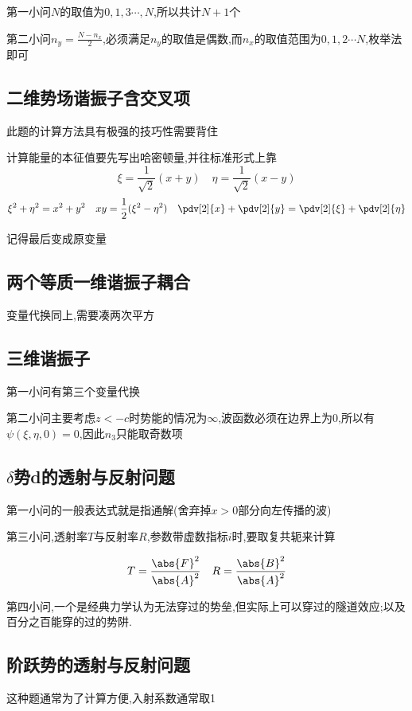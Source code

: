             第一小问$N$的取值为$0,1,3\cdots,N$,所以共计$N+1$个
            
            第二小问$ n_{y} = \frac{ N - n_{x}}{2} $,必须满足$n_{y}$的取值是偶数,而$n_{x}$的取值范围为$0,1,2\cdots N$,枚举法即可

        \subsection{二维势场谐振子含交叉项}
            此题的计算方法具有极强的技巧性需要背住
            
            计算能量的本征值要先写出哈密顿量,并往标准形式上靠
            $$ \xi = \frac{1}{\sqrt{2}} (x+y) \quad \eta = \frac{1}{\sqrt{2}} (x -y)  $$
            $$ \xi^{2} + \eta^{2} = x^{2} + y^{2} \quad xy = \frac{1}{2} (\xi^{2} - \eta^{2}) \quad \pdv[2]{x} + \pdv[2]{y} = \pdv[2]{\xi} + \pdv[2]{\eta}$$
            
            记得最后变成原变量

        \subsection{两个等质一维谐振子耦合}
            变量代换同上,需要凑两次平方

        \subsection{三维谐振子}
            第一小问有第三个变量代换

            第二小问主要考虑$z<-c$时势能的情况为$\infty$,波函数必须在边界上为0,所以有$ \psi(\xi,\eta,0) = 0 $,因此$n_{3}$只能取奇数项
        
        \subsection{\texorpdfstring{$\delta$}{}势d的透射与反射问题}
            第一小问的一般表达式就是指通解(舍弃掉$x>0$部分向左传播的波)

            第三小问,透射率$T$与反射率$R$,参数带虚数指标$i$时,要取复共轭来计算  

            $$ T = \frac{\abs{F}^{2}}{\abs{A}^{2}} \quad R = \frac{\abs{B}^{2}}{\abs{A}^{2}} $$

            第四小问,一个是经典力学认为无法穿过的势垒,但实际上可以穿过的隧道效应;以及百分之百能穿的过的势阱.

        \subsection{阶跃势的透射与反射问题}
            这种题通常为了计算方便,入射系数通常取1

